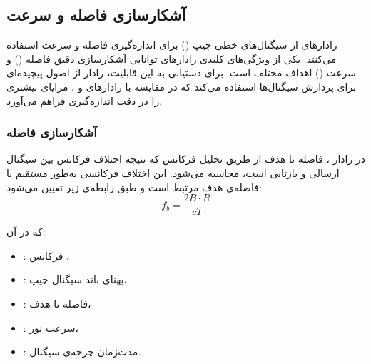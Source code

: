 \subsection{آشکارسازی فاصله و سرعت} 
\label{sec:range-velocity-detection}

رادارهای  از سیگنال‌های خطی چیپ () برای اندازه‌گیری فاصله و سرعت استفاده می‌کنند. یکی از ویژگی‌های کلیدی رادارهای  توانایی آشکارسازی دقیق فاصله () و سرعت () اهداف مختلف است. برای دستیابی به این قابلیت، رادار  از اصول پیچیده‌ای برای پردازش سیگنال‌ها استفاده می‌کند که در مقایسه با رادارهای  و ، مزایای بیشتری را در دقت اندازه‌گیری فراهم می‌آورد.

\subsubsection{آشکارسازی فاصله} %
\label{sec:range-detection}

در رادار ، فاصله تا هدف از طریق تحلیل فرکانس  که نتیجه اختلاف فرکانس بین سیگنال ارسالی و بازتابی است، محاسبه می‌شود. این اختلاف فرکانسی به‌طور مستقیم با فاصله‌ی هدف مرتبط است و طبق رابطه‌ی زیر تعیین می‌شود:
\begin{equation}
f_b = \frac{2B \cdot R}{cT}
\label{eq:beat_frequency}
\end{equation}

که در آن:
\begin{itemize}
    \item {}: فرکانس ،
    \item {}: پهنای باند سیگنال چیپ،
    \item {}: فاصله تا هدف،
    \item {}: سرعت نور،
    \item {}: مدت‌زمان چرخه‌ی سیگنال.
\end{itemize}

